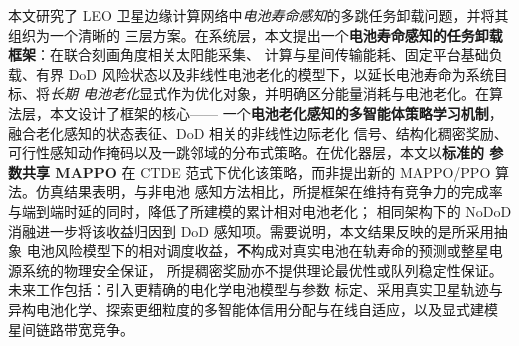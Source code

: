 \documentclass[a4paper,11pt]{article}
\begin{document}
本文研究了 LEO 卫星边缘计算网络中\emph{电池寿命感知}的多跳任务卸载问题，并将其组织为一个清晰的
三层方案。在系统层，本文提出一个\textbf{电池寿命感知的任务卸载框架}：在联合刻画角度相关太阳能采集、
计算与星间传输能耗、固定平台基础负载、有界 DoD 风险状态以及非线性电池老化的模型下，以延长电池寿命为系统目标、将\emph{长期
电池老化}显式作为优化对象，并明确区分能量消耗与电池老化。在算法层，本文设计了框架的核心——
一个\textbf{电池老化感知的多智能体策略学习机制}，融合老化感知的状态表征、DoD 相关的非线性边际老化
信号、结构化稠密奖励、可行性感知动作掩码以及一跳邻域的分布式策略。在优化器层，本文以\textbf{标准的
参数共享 MAPPO} 在 CTDE 范式下优化该策略，而非提出新的 MAPPO/PPO 算法。仿真结果表明，与非电池
感知方法相比，所提框架在维持有竞争力的完成率与端到端时延的同时，降低了所建模的累计相对电池老化；
相同架构下的 NoDoD 消融进一步将该收益归因到 DoD 感知项。需要说明，本文结果反映的是所采用抽象
电池风险模型下的相对调度收益，\textbf{不}构成对真实电池在轨寿命的预测或整星电源系统的物理安全保证，
所提稠密奖励亦不提供理论最优性或队列稳定性保证。未来工作包括：引入更精确的电化学电池模型与参数
标定、采用真实卫星轨迹与异构电池化学、探索更细粒度的多智能体信用分配与在线自适应，以及显式建模
星间链路带宽竞争。
\end{document}
